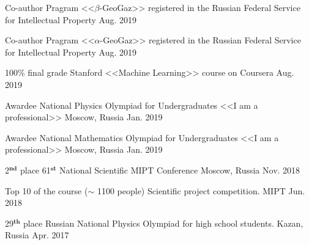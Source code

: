 
\begin{cvhonors}
    
  \cvhonor
    {Co-author} %
    {Pragram <<$\beta$-GeoGaz>> registered in the Russian Federal Service for Intellectual Property} %
    {} %
    {Aug. 2019} %
            
  \cvhonor
    {Co-author} %
    {Pragram <<$\alpha$-GeoGaz>> registered in the Russian Federal Service for Intellectual Property} %
    {} %
    {Aug. 2019} %
    
  \cvhonor
    {100\% final grade} %
    {Stanford <<Machine Learning>> course on Coursera} %
    {} %
    {Aug. 2019} %
    
  \cvhonor
    {Awardee} %
    {National Physics Olympiad for Undergraduates <<I am a professional>>} %
    {Moscow, Russia} %
    {Jan. 2019} %
    
    
  \cvhonor
    {Awardee} %
    {National Mathematics Olympiad for Undergraduates <<I am a professional>>} %
    {Moscow, Russia} %
    {Jan. 2019} %
    
  \cvhonor
    {2$^{\textbf{nd}}$ place} %
    {61$^{\textbf{st}}$ National Scientific MIPT Conference} %
    {Moscow, Russia} %
    {Nov. 2018} %
    
  \cvhonor
    {Top 10 of the course ($\sim$ 1100 people)} %
    {Scientific project competition.} %
    {MIPT} %
    {Jun. 2018} %

  \cvhonor
    {29$^{\textbf{th}}$ place} %
    {Russian National Physics Olympiad for high school students.} %
    {Kazan, Russia} %
    {Apr. 2017} %
	
\end{cvhonors}

